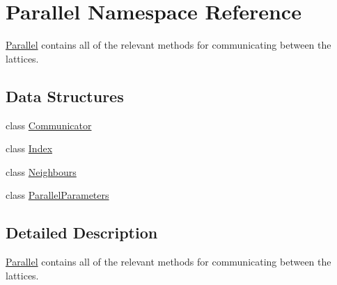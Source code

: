 \hypertarget{namespace_parallel}{}\section{Parallel Namespace Reference}
\label{namespace_parallel}


\mbox{\hyperlink{namespace_parallel}{Parallel}} contains all of the relevant methods for communicating between the lattices.  


\subsection*{Data Structures}
\begin{DoxyCompactItemize}
\item 
class \mbox{\hyperlink{class_parallel_1_1_communicator}{Communicator}}
\item 
class \mbox{\hyperlink{class_parallel_1_1_index}{Index}}
\item 
class \mbox{\hyperlink{class_parallel_1_1_neighbours}{Neighbours}}
\item 
class \mbox{\hyperlink{class_parallel_1_1_parallel_parameters}{Parallel\+Parameters}}
\end{DoxyCompactItemize}


\subsection{Detailed Description}
\mbox{\hyperlink{namespace_parallel}{Parallel}} contains all of the relevant methods for communicating between the lattices. 